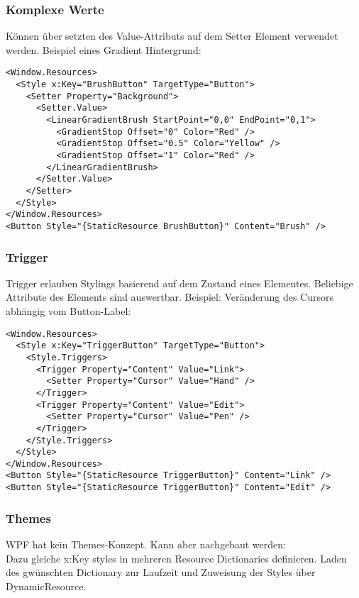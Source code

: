 \subsubsection{Komplexe Werte}
Können über setzten des Value-Attributs auf dem Setter Element verwendet werden. Beispiel eines Gradient Hintergrund:
\begin{lstlisting}
<Window.Resources>
  <Style x:Key="BrushButton" TargetType="Button">
    <Setter Property="Background">
      <Setter.Value>
        <LinearGradientBrush StartPoint="0,0" EndPoint="0,1">
          <GradientStop Offset="0" Color="Red" />
          <GradientStop Offset="0.5" Color="Yellow" />
          <GradientStop Offset="1" Color="Red" />
        </LinearGradientBrush>
      </Setter.Value>
    </Setter>
  </Style>
</Window.Resources>
<Button Style="{StaticResource BrushButton}" Content="Brush" />
\end{lstlisting}
\subsubsection{Trigger}
Trigger erlauben Stylings basierend auf dem Zustand eines Elementes. Beliebige Attribute des Elements sind auswertbar. Beispiel: Veränderung des Cursors abhängig vom Button-Label:
\begin{lstlisting}
<Window.Resources>
  <Style x:Key="TriggerButton" TargetType="Button">
    <Style.Triggers>
      <Trigger Property="Content" Value="Link">
        <Setter Property="Cursor" Value="Hand" />
      </Trigger>
      <Trigger Property="Content" Value="Edit">
        <Setter Property="Cursor" Value="Pen" />
      </Trigger>
    </Style.Triggers>
  </Style>
</Window.Resources>
<Button Style="{StaticResource TriggerButton}" Content="Link" />
<Button Style="{StaticResource TriggerButton}" Content="Edit" />
\end{lstlisting}
\subsubsection{Themes}
WPF hat kein Themes-Konzept. Kann aber nachgebaut werden:\\
Dazu gleiche x:Key styles in mehreren Resource Dictionaries definieren. Laden des gwünschten Dictionary zur Laufzeit und Zuweisung der Styles über DynamicResource.
